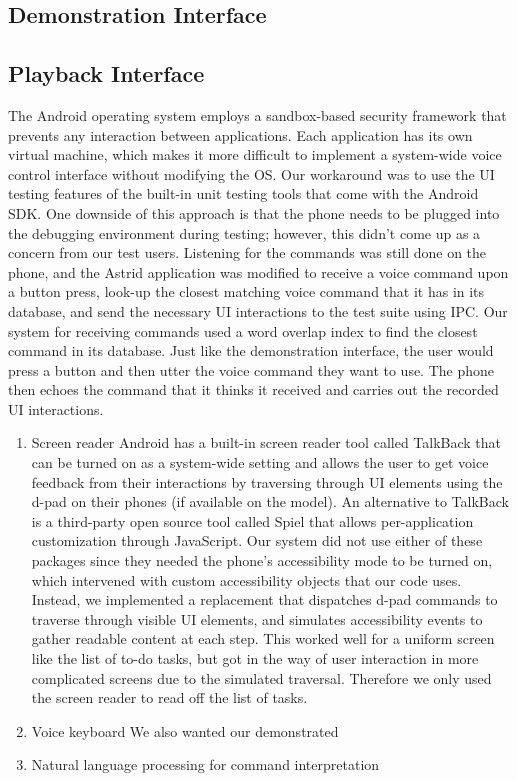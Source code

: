 \documentclass[letterpaper]{article}
\begin{document}

\subsection{Demonstration Interface}

\subsection{Playback Interface}
The Android operating system employs a sandbox-based security framework that prevents any interaction between applications. 
Each application has its own virtual machine, which makes it more difficult to implement a system-wide voice control interface without modifying the OS.
Our workaround was to use the UI testing features of the built-in unit testing tools that come with the Android SDK.
One downside of this approach is that the phone needs to be plugged into the debugging environment during testing; however, 
this didn't come up as a concern from our test users. Listening for the commands was still done on the phone, 
and the Astrid application was modified to receive a voice command upon a button press, look-up the closest matching voice command 
that it has in its database, and send the necessary UI interactions to the test suite using IPC. Our system for receiving commands used 
a word overlap index to find the closest command in its database. Just like the demonstration interface, the user would press a button 
and then utter the voice command they want to use. The phone then echoes the command that it thinks it received and carries out the 
recorded UI interactions. 
 
\begin{enumerate}
\item Screen reader
Android has a built-in screen reader tool called TalkBack that can be turned on as a system-wide setting and allows the user to get 
voice feedback from their interactions by traversing through UI elements using the d-pad on their phones (if available on the model). 
An alternative to TalkBack is a third-party open source tool called Spiel that allows per-application customization through JavaScript. 
Our system did not use either of these packages since they needed the phone's accessibility mode to be turned on, which intervened with 
custom accessibility objects that our code uses. Instead, we implemented a replacement that dispatches d-pad commands to traverse 
through visible UI elements, and simulates accessibility events to gather readable content at each step. This worked well for a uniform 
screen like the list of to-do tasks, but got in the way of user interaction in more complicated screens due to the simulated traversal. 
Therefore we only used the screen reader to read off the list of tasks.

\item Voice keyboard
We also wanted our demonstrated 

\item Natural language processing for command interpretation
\end{enumerate}
\end{document}
